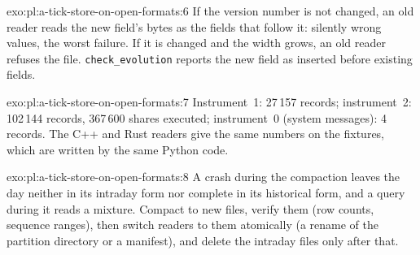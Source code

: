 \begin{solution}{exo:pl:a-tick-store-on-open-formats:6}
If the version number is not changed, an old reader reads the new field's bytes as the fields that follow it: silently wrong
values, the worst failure. If it is changed and the width grows, an old reader refuses the file. \texttt{check\_evolution} reports
the new field as inserted before existing fields.
\end{solution}

\begin{solution}{exo:pl:a-tick-store-on-open-formats:7}
Instrument~1: 27\,157 records; instrument~2: 102\,144 records, 367\,600 shares executed; instrument~0 (system messages): 4
records. The C++ and Rust readers give the same numbers on the fixtures, which are written by the same Python code.
\end{solution}

\begin{solution}{exo:pl:a-tick-store-on-open-formats:8}
A crash during the compaction leaves the day neither in its intraday form nor complete in its historical form, and a query during
it reads a mixture. Compact to new files, verify them (row counts, sequence ranges), then switch readers to them atomically (a
rename of the partition directory or a manifest), and delete the intraday files only after that.
\end{solution}

